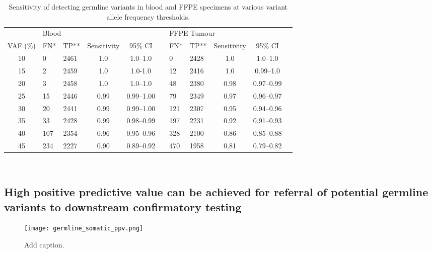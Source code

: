 \documentclass{bmcart}
\begin{document}
\begin{table}[H]
\caption{Sensitivity of detecting germline variants in blood and FFPE specimens at various variant allele frequency thresholds.}
\label{sensitivity}
\centering
      \begin{tabular}{cllcclllccl}
        \hline
				\multicolumn{1}{l}{ }
				&
				\multicolumn{4}{l}{Blood}
				&&
				\multicolumn{4}{l}{FFPE Tumour}
        \\
				\cline{2-5}\cline{7-10}
        VAF (\%) & FN\mbox{*} & TP\mbox{**} & Sensitivity & 95\% CI && FN\mbox{*} & TP\mbox{**} & Sensitivity & 95\% CI
        \\
        \hline
        10 & 0 & 2461 & 1.0 & 1.0--1.0 && 0 & 2428 & 1.0 & 1.0--1.0
        \\
        15 & 2 & 2459 & 1.0 & 1.0-1.0 && 12 & 2416 & 1.0 & 0.99--1.0
        \\
        20 & 3 & 2458 & 1.0 & 1.0--1.0 && 48 & 2380 & 0.98 & 0.97--0.99
        \\
        25 & 15 & 2446 & 0.99 & 0.99--1.00 && 79 & 2349 & 0.97 & 0.96--0.97
        \\
        30 & 20 & 2441 & 0.99 & 0.99--1.00 && 121 & 2307 & 0.95 & 0.94--0.96
        \\
        35 & 33 & 2428 & 0.99 & 0.98--0.99 && 197 & 2231 & 0.92 & 0.91--0.93
        \\
        40 & 107 & 2354 & 0.96 & 0.95--0.96 && 328 & 2100 & 0.86 & 0.85--0.88
        \\
        45 & 234 & 2227 & 0.90 & 0.89--0.92 && 470 & 1958 & 0.81 & 0.79--0.82
        \\
				\hline
      \end{tabular} \\
\end{table}

\subsection*{High positive predictive value can be achieved for referral of potential germline variants to downstream confirmatory testing}

\begin{figure}[!h]
	\texttt{[image: germline\_somatic\_ppv.png]}
	\caption{Add caption.}
	\label{fig:germline_somatic_ppv}
\end{figure}
\end{document}

